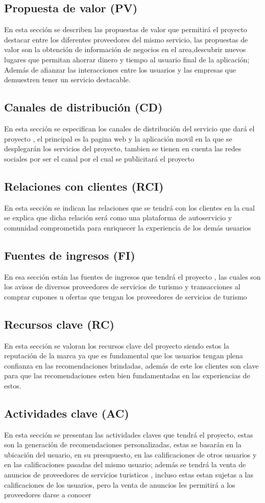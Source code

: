 \subsection{Propuesta de valor (PV)}
En esta sección se describen las propuestas de valor que permitirá el proyecto destacar entre los diferentes proveedores del mismo servicio, las propuestas de valor son la obtención de información de negocios en el area,descubrir nuevos lugares que permitan ahorrar dinero y tiempo al usuario final de la aplicación; Además de afianzar las interacciones entre los usuarios y las empresas que demuestren tener un servicio destacable.
\subsection{Canales de distribución (CD)}
En esta sección se especifican los canales de distribución del servicio que dará el proyecto , el principal es la pagina web y la aplicación movil en la que se desplegarán los servicios del proyecto, tambien se tienen en cuenta las redes sociales por ser el canal por el cual se publicitará el proyecto
\subsection{Relaciones con clientes (RCI)}
En esta sección se indican las relaciones que se tendrá con los clientes en la cual se explica que dicha relación será como una plataforma de autoservicio y comunidad comprometida para enriquecer la experiencia de los demás usuarios
\subsection{Fuentes de ingresos (FI)}
En esa sección están las fuentes de ingresos que tendrá el proyecto , las cuales son los avisos de diversos proveedores de servicios de turismo y transacciones al comprar cupones u ofertas que tengan los proveedores de servicios de turismo
\subsection{Recursos clave (RC)}
En esta sección se valoran los recursos clave del proyecto siendo estos la reputación de la marca ya que es fundamental que los usuarios tengan plena confianza en las recomendaciones brindadas, además de este los clientes son clave para que las recomendaciones esten bien fundamentadas en las experiencias de estos.
\subsection{Actividades clave (AC)}
En esta sección se presentan las actividades claves que tendrá el proyecto, estas son la generación de recomendaciones personalizadas, estas se basarán en la ubicación del usuario, en su presupuesto, en las calificaciones de otros usuarios y en las calificaciones pasadas del mismo usuario; además se tendrá la venta de anuncios de proveedores de servicios turisticos , incluso estas estan sujetas a las calificaciones de los usuarios, pero la venta de anuncios les permitirá a los proveedores darse a conocer
